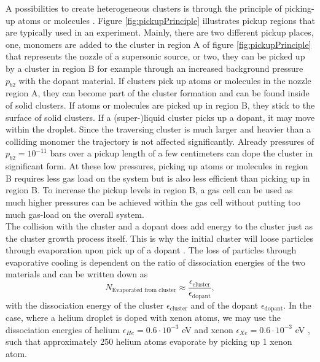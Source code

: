 A possibilities to create heterogeneous clusters is through the principle of picking-up atoms or molecules \cite{Gough-1985-JChemPhys,Haberland-1994-Springer}. Figure \ref{fig:pickupPrinciple} illustrates pickup regions that are typically used in an experiment. Mainly, there are two different pickup places, one, monomers are added to the cluster in region A of figure \ref{fig:pickupPrinciple} that represents the nozzle of a supersonic source, or two, they can be picked up by a cluster in region B for example through an increased background pressure $p_{b2}$ with the dopant material. If clusters pick up atoms or molecules in the nozzle region A, they can become part of the cluster formation and can be found inside of solid clusters. If atoms or molecules are picked up in region B, they stick to the surface of solid clusters. If a (super-)liquid cluster picks up a dopant, it may move within the droplet. Since the traversing cluster is much larger and heavier than a colliding monomer the trajectory is not affected significantly. Already pressures of $p_{b2}=10^{-11}$ bars over a pickup length of a few centimeters can dope the cluster in significant form. At these low pressures, picking up atoms or molecules in region B requires less gas load on the system but is also less efficient than picking up in region B. To increase the pickup levels in region B, a gas cell can be used as much higher pressures can be achieved within the gas cell without putting too much gas-load on the overall system.\\
The collision with the cluster and a dopant does add energy to the cluster just as the cluster growth process itself. This is why the initial cluster will loose particles through evaporation upon pick up of a dopant \citep{Gomez-2011-JCP}. The loss of particles through evaporative cooling is dependent on the ratio of dissociation energies of the two materials and can be written down as
\begin{equation}
N_{\text{Evaporated from cluster}} \approx \frac{\epsilon_{\text{cluster}}}{\epsilon_{\text{dopant}}},
\label{eq:evaporated-amount}
\end{equation}
with the dissociation energy of the cluster $\epsilon_{\text{cluster}}$ and of the dopant $\epsilon_{\text{dopant}}$. In the case, where a helium droplet is doped with xenon atoms, we may use the dissociation energies of helium $\epsilon_{He}=0.6\cdot 10^{-3}$ eV and xenon $\epsilon_{Xe}=0.6\cdot 10^{-3}$ eV \citep{Gomez-2011-JCP,Gomez-2014-Science}, such that approximately 250 helium atoms evaporate by picking up 1 xenon atom.\\
